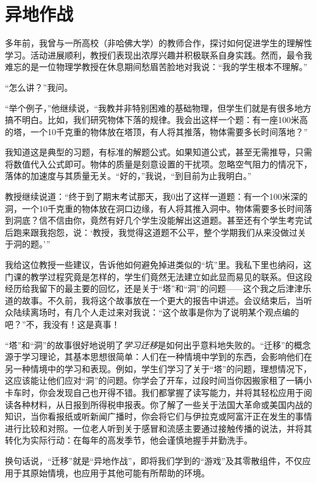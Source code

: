
\chapter{异地作战}

多年前，我曾与一所高校（非哈佛大学）的教师合作，探讨如何促进学生的理解性学习。活动进展顺利，教授们表现出浓厚兴趣并积极联系自身实践。然而，最令我难忘的是一位物理学教授在休息期间愁眉苦脸地对我说：“我的学生根本不理解。”

“怎么讲？”我问。

“举个例子，”他继续说，“我教并非特别困难的基础物理，但学生们就是有很多地方搞不明白。比如，我们研究物体下落的规律。我会出这样一个题：有一座100米高的塔，一个10千克重的物体放在塔顶，有人将其推落，物体需要多长时间落地？”

我知道这是典型的习题，有标准的解题公式。如果知道公式，甚至无需推导，只需将数值代入公式即可。物体的质量是刻意设置的干扰项。忽略空气阻力的情况下，落体的加速度与其质量无关。“好的，”我说，“到目前为止我明白。”

教授继续说道：“终于到了期末考试那天，我0出了这样一道题：有一个100米深的洞，一个10千克重的物体放在洞口边缘，有人将其推入洞中。物体需要多长时间落到洞底？信不信由你，竟然有好几个学生没能解出这道题。甚至还有个学生考完试后跑来跟我抱怨，说：‘教授，我觉得这道题不公平，整个学期我们从来没做过关于洞的题。’”

我给这位教授一些建议，告诉他如何避免掉进类似的“坑”里。我私下里也纳闷，这门课的教学过程究竟是怎样的，学生们竟然无法建立如此显而易见的联系。但这段经历给我留下的最主要的回忆，还是关于“塔”和“洞”的问题——这个我之后津津乐道的故事。不久前，我将这个故事放在一个更大的报告中讲述。会议结束后，当听众陆续离场时，有几个人走过来对我说：“这个故事是你为了说明某个观点编的吧？”不，我没有！这是真事！

“塔”和“洞”的故事很好地说明了\textit{学习迁移}是如何出乎意料地失败的。“迁移”的概念源于学习理论，其基本思想很简单：人们在一种情境中学到的东西，会影响他们在另一种情境中的学习和表现。例如，学生们学习了关于“塔”的问题，理想情况下，这应该能让他们应对“洞”的问题。你学会了开车，过段时间当你因搬家租了一辆小卡车时，你会发现自己也开得不错。我们都掌握了读写能力，并将其轻松应用于阅读各种材料，从日报到所得税申报表。你了解了一些关于法国大革命或美国内战的知识，当你看报纸或听新闻广播时，你会将它们与伊拉克或阿富汗正在发生的事情进行比较和对照。一位老人听到关于感冒和流感主要通过接触传播的说法，并将其转化为实际行动：在每年的高发季节，他会谨慎地握手并勤洗手。

换句话说，“迁移”就是“异地作战”，即将我们学到的“游戏”及其零散组件，不仅应用于其原始情境，也应用于其他可能有所帮助的环境。


